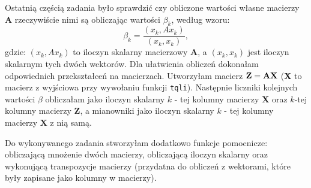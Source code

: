 \documentclass{article}
\begin{document}
\par Ostatnią częścią zadania było sprawdzić czy obliczone wartości własne macierzy $\textbf{A}$ rzeczywiście nimi są obliczając wartości $\beta_k$, według wzoru:
\begin{equation}
\beta_k = \frac{(x_k, Ax_k)}{(x_k, x_k)},
\end{equation}
gdzie: $(x_k, Ax_k)$ to iloczyn skalarny macierzowy $\textbf{A}$, a $(x_k, x_k)$ jest iloczyn skalarnym tych dwóch wektorów. Dla ułatwienia obliczeń dokonałam odpowiednich przekształceń na macierzach. Utworzyłam macierz $\textbf{Z} = \nolinebreak \textbf{AX}$ (\textbf{X} to macierz z wyjściowa przy wywołaniu funkcji \texttt{tqli}). Następnie liczniki kolejnych wartości $\beta$ obliczałam jako iloczyn skalarny $k$ - tej kolumny macierzy \textbf{X} oraz $k$-tej kolumny macierzy \textbf{Z}, a \nolinebreak mianowniki jako iloczyn skalarny $k$ - tej kolumny macierzy \textbf{X} z nią samą.
\par Do wykonywanego zadania stworzyłam dodatkowo funkcje pomocnicze: obliczającą mnożenie dwóch macierzy, obliczającą iloczyn skalarny oraz wykonującą transpozycje macierzy (przydatna do obliczeń z \nolinebreak wektorami, które były zapisane jako kolumny w macierzy).
\end{document}
